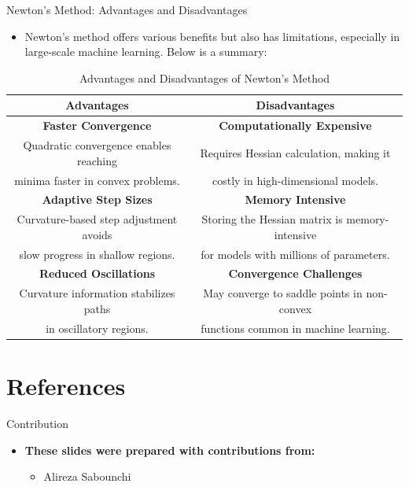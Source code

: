 \documentclass[serif, aspectratio=169]{beamer}
\begin{document}
\begin{frame}{Newton's Method: Advantages and Disadvantages}
    \begin{itemize}
        \item Newton's method offers various benefits but also has limitations, especially in large-scale machine learning. Below is a summary:
    \end{itemize}
    \begin{table}[]
        \centering
        \small %
        \begin{tabular}{|c|c|}
            \hline
            \textbf{Advantages} & \textbf{Disadvantages} \\
            \hline
            \textbf{Faster Convergence} & \textbf{Computationally Expensive} \\
            Quadratic convergence enables reaching & Requires Hessian calculation, making it\\
            minima faster in convex problems. & costly in high-dimensional models. \\
            \hline
            \textbf{Adaptive Step Sizes} & \textbf{Memory Intensive} \\
            Curvature-based step adjustment avoids & Storing the Hessian matrix is memory-intensive\\
            slow progress in shallow regions. & for models with millions of parameters. \\
            \hline
            \textbf{Reduced Oscillations} & \textbf{Convergence Challenges} \\
            Curvature information stabilizes paths & May converge to saddle points in non-convex\\
            in oscillatory regions. & functions common in machine learning. \\
            \hline
        \end{tabular}
        \caption{Advantages and Disadvantages of Newton's Method}
    \end{table}
\end{frame}

\section{References}
\begin{frame}{Contribution}
    \begin{itemize}
        \item \textbf{These slides were prepared with contributions from: }
        \begin{itemize}
            \item Alireza Sabounchi
        \end{itemize}
    \end{itemize}
\end{frame}

\begin{frame}[allowframebreaks]
    
    \nocite{*} %
    \tiny
\end{frame}
\end{document}

